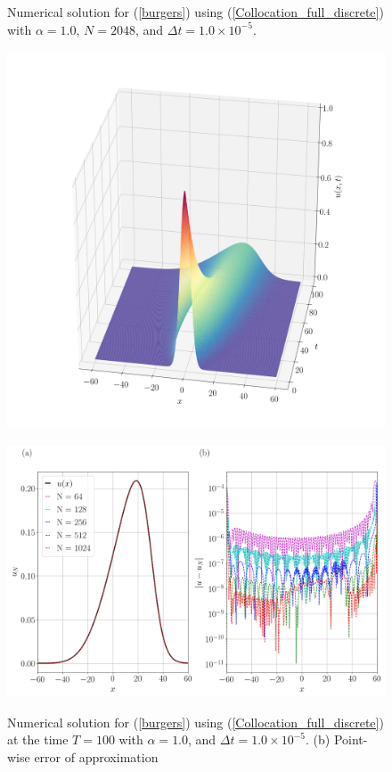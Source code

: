 	\newpage
	\begin{figure}[H]
		\centering
		\caption{Numerical solution for (\ref{burgers}) using (\ref{Collocation_full_discrete}) with $\alpha = 1.0$, $N=2048$, and $\Delta t = 1.0 \times 10^{-5}$.}
		\includegraphics[width=12cm]{Figures/Collocation/Graphics/eps=1.0/Numerical_Solution_alpha=1.png}
		\label{Collocation_alpha=1}
		\caption{Numerical solution for (\ref{burgers}) using (\ref{Collocation_full_discrete}) at the time $T = 100$ with $\alpha = 1.0$, and $\Delta t = 1.0 \times 10^{-5}$. (b) Point-wise error of approximation}
		\includegraphics[width=12.5cm]{Figures/Collocation/Graphics/eps=1.0/Numerical_Solution_alpha=1_T=100.png}
		\label{Collocation_alpha=1_T}
	\end{figure}
